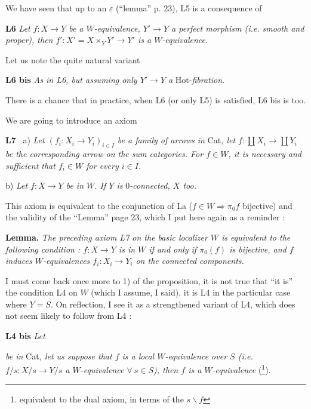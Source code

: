 We have seen that up to an $\varepsilon$ (``lemma'' p. 23), L5 is a consequence of

\textbf{L6} \textit{Let $f : X \longrightarrow Y$ be a $W$-equivalence, $Y' \longrightarrow Y$ a perfect morphism (i.e. smooth and proper), then $f' : X' = X \times_Y Y' \longrightarrow Y'$ is a $W$-equivalence.}

Let us note the quite natural variant

\textbf{L6 bis} \textit{As in L6, but assuming only $Y' \longrightarrow Y$ a} Hot-\textit{fibration.}


There is a chance that in practice, when L6 (or only L5) is satisfied, L6 bis is too. %

We are going to introduce an axiom

\textbf{L7} \ a) \textit{Let $(f_i : X_i \longrightarrow Y_i)_{i \in I}$ be a family of arrows in} Cat\textit{, let $f : \coprod X_i \longrightarrow \coprod Y_i$ be the corresponding arrow on the sum categories. For $f \in W$, it is necessary and sufficient that $f_i \in W$ for every $i \in I$.}

\hspace*{2em}b) \textit{Let $f : X \longrightarrow Y$ be in $W$. If $Y$ is} $0$\textit{-connected, $X$ too.}

This axiom is equivalent to the conjunction of La ($f \in W \Longrightarrow \pi_0 f$ bijective) and the validity of the ``Lemma'' page 23, which I put here again as a reminder :

\textbf{Lemma.} \textit{The preceding axiom L7 on the basic localizer $W$ is equivalent to the following condition : $f : X \longrightarrow Y$ is in $W$ if and only if $\pi_0(f)$ is bijective, and $f$ induces $W$-equivalences $f_i : X_i \longrightarrow Y_i$ on the connected components.}

I must come back once more to 1) of the proposition, it is not true that ``it is'' the condition L4 on $W$ (which I assume, I said), it is L4 in the particular case where $Y = S$. On reflection, I see it as a strengthened variant of L4, which does not seem likely to follow from L4 :

\textbf{L4 bis} \textit{Let}  \textit{be in} Cat\textit{, let us suppose that $f$ is a local $W$-equivalence over $S$ (i.e. $f/s : X/s \longrightarrow Y/s$ a $W$-equivalence $\forall\ s \in S$), then $f$ is a $W$-equivalence} (\footnote[29]{equivalent to the dual axiom, in terms of the $s\backslash f$}).

